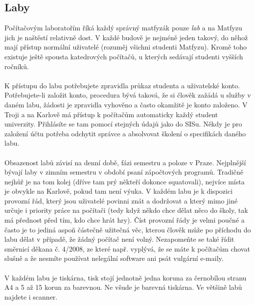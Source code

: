 \subsection{Laby}
Počítačovým laboratořím říká každý správný matfyzák pouze \textit{lab} a na
Matfyzu jich je naštěstí relativně dost. V každé budově je nejméně jeden takový,
do něhož mají přístup normální uživatelé (rozuměj všichni studenti Matfyzu).
Kromě toho existuje ještě spousta katedrových počítačů, u kterých sedávají
studenti vyšších ročníků.
\\\\
K přístupu do labu potřebujete zpravidla průkaz studenta a uživatelské konto.
Potřebujete-li založit konto, procedura bývá taková, že si člověk zažádá u
služby v daném labu, žádosti je zpravidla vyhověno a často okamžitě je konto
založeno. V Troji a na Karlově má přístup k počítačům automaticky každý student
univerzity. Přihlásíte se tam pomocí stejných údajů jako do SISu. Někdy je pro
založení účtu potřeba odchytit správce a absolvovat školení o specifikách daného
labu.
\\\\
Obsazenost labů závisí na denní době, fázi semestru a poloze v Praze. Nejplnější
bývají laby v zimním semestru v období psaní zápočtových programů. Tradičně
nejhůř je na tom kolej (dříve tam prý někteří dokonce squatovali), nejvíce místa
je obvykle na Karlově, pokud tam není výuka. V každém labu je k dispozici
provozní řád, který jsou uživatelé povinni znát a dodržovat a který mimo jiné
určuje i priority práce na počítači (tedy když někdo chce dělat něco do školy,
tak má přednost před tím, kdo chce hrát hry). Číst provozní řády je velmi poučné
a často je to jediná aspoň částečně užitečná věc, kterou člověk může po příchodu
do labu dělat v případě, že žádný počítač není volný. Nezapomeňte se také řídit
směrnicí děkana č. 4/2008, ze které např. vyplývá, že se máte k počítačům chovat
slušně a že nesmíte používat nelegální software ani psát vulgární e-maily.
\\\\
V každém labu je tiskárna, tisk stojí jednotně jedna koruna za černobílou stranu
A4 a 5 až 15 korun za barevnou. Ne všude je barevná tiskárna. Ve většině labů
najdete i scanner.



